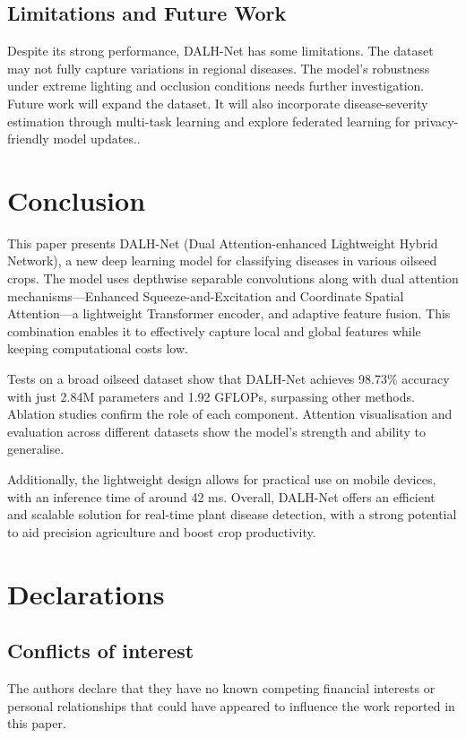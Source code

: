 \documentclass[default, iicol]{sn-jnl}
\theoremstyle{thmstyleone}%
\theoremstyle{thmstyletwo}%
\theoremstyle{thmstylethree}%
\begin{document}
\subsection{Limitations and Future Work}

Despite its strong performance, DALH-Net has some limitations. The dataset may not fully capture variations in regional diseases. The model’s robustness under extreme lighting and occlusion conditions needs further investigation. Future work will expand the dataset. It will also incorporate disease-severity estimation through multi-task learning and explore federated learning for privacy-friendly model updates..

\section{Conclusion}\label{sec:conclusion}
This paper presents DALH-Net (Dual Attention-enhanced Lightweight Hybrid Network), a new deep learning model for classifying diseases in various oilseed crops. The model uses depthwise separable convolutions along with dual attention mechanisms—Enhanced Squeeze-and-Excitation and Coordinate Spatial Attention—a lightweight Transformer encoder, and adaptive feature fusion. This combination enables it to effectively capture local and global features while keeping computational costs low.

Tests on a broad oilseed dataset show that DALH-Net achieves 98.73\% accuracy with just 2.84M parameters and 1.92 GFLOPs, surpassing other methods. Ablation studies confirm the role of each component. Attention visualisation and evaluation across different datasets show the model’s strength and ability to generalise.

Additionally, the lightweight design allows for practical use on mobile devices, with an inference time of around 42 ms. Overall, DALH-Net offers an efficient and scalable solution for real-time plant disease detection, with a strong potential to aid precision agriculture and boost crop productivity.

\section*{Declarations}
\subsection{Conflicts of interest}
The authors declare that they have no known competing financial interests or personal relationships that could have appeared to influence the work reported in this paper.
\end{document}
